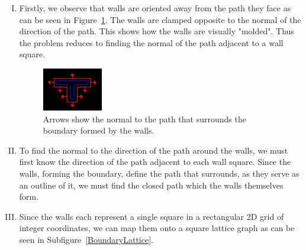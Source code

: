 \documentclass[a4paper,12pt]{article}
\begin{document}
\begin{enumerate}[I.]
\item Firstly, we observe that walls are oriented away from the path they face as can be seen in Figure~\ref{PathNormal}. The walls are clamped opposite to the normal of the direction of the path. This shows how the walls are visually "molded". Thus the problem reduces to finding the normal of the path adjacent to a wall square.  
\begin{figure}[H]
	\centering
	\includegraphics[width=0.4\linewidth]{Image-6.png}
	\caption {Arrows show the normal to the path that surrounds the boundary formed by the walls.\autocite{myself}} \label{PathNormal}
\end{figure}

\item To find the normal to the direction of the path around the walls, we must first know the direction of the path adjacent to each wall square. Since the walls, forming the boundary, define the path that surrounds, as they serve as an outline of it, we must find the closed path which the walls themselves form.\label{ClosedPathObservation}

\item Since the walls each represent a single square in a rectangular 2D grid of integer coordinates, we can map them onto a square lattice graph as can be seen in Subfigure~\ref{BoundaryLattice}.\label{SquareLatticeObservation}


\end{enumerate}
\end{document}
